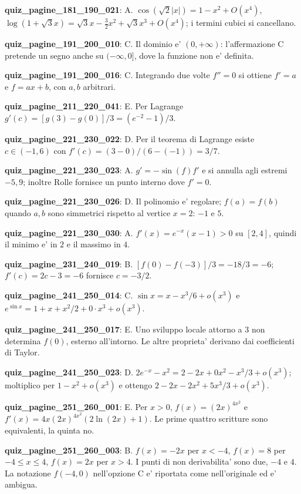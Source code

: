 \documentclass[11pt,a4paper]{article}
\newcounter{quiz}
\begin{document}
\noindent\textbf{quiz\_pagine\_181\_190\_021}: A. $\cos(\sqrt2|x|)=1-x^2+O(x^4)$, $\log(1+\sqrt3x)=\sqrt3x-\frac32x^2+\sqrt3x^3+O(x^4)$; i termini cubici si cancellano.\par\medskip
\noindent\textbf{quiz\_pagine\_191\_200\_010}: C. Il dominio e' $(0,+\infty)$: l'affermazione C pretende un segno anche su $(-\infty,0]$, dove la funzione non e' definita.\par\medskip
\noindent\textbf{quiz\_pagine\_191\_200\_016}: C. Integrando due volte $f''=0$ si ottiene $f'=a$ e $f=ax+b$, con $a,b$ arbitrari.\par\medskip
\noindent\textbf{quiz\_pagine\_211\_220\_041}: E. Per Lagrange $g'(c)=[g(3)-g(0)]/3=(e^{-2}-1)/3$.\par\medskip
\noindent\textbf{quiz\_pagine\_221\_230\_022}: D. Per il teorema di Lagrange esiste $c\in(-1,6)$ con $f'(c)=(3-0)/(6-(-1))=3/7$.\par\medskip
\noindent\textbf{quiz\_pagine\_221\_230\_023}: A. $g'=-\sin(f)f'$ e si annulla agli estremi $-5,9$; inoltre Rolle fornisce un punto interno dove $f'=0$.\par\medskip
\noindent\textbf{quiz\_pagine\_221\_230\_026}: D. Il polinomio e' regolare; $f(a)=f(b)$ quando $a,b$ sono simmetrici rispetto al vertice $x=2$: $-1$ e $5$.\par\medskip
\noindent\textbf{quiz\_pagine\_221\_230\_030}: A. $f'(x)=e^{-x}(x-1)>0$ su $[2,4]$, quindi il minimo e' in $2$ e il massimo in $4$.\par\medskip
\noindent\textbf{quiz\_pagine\_231\_240\_019}: B. $[f(0)-f(-3)]/3=-18/3=-6$; $f\prime(c)=2c-3=-6$ fornisce $c=-3/2$.\par\medskip
\noindent\textbf{quiz\_pagine\_241\_250\_014}: C. $\sin x=x-x^3/6+o(x^3)$ e $e^{\sin x}=1+x+x^2/2+0\cdot x^3+o(x^3)$.\par\medskip
\noindent\textbf{quiz\_pagine\_241\_250\_017}: E. Uno sviluppo locale attorno a 3 non determina $f(0)$, esterno all'intorno. Le altre proprieta' derivano dai coefficienti di Taylor.\par\medskip
\noindent\textbf{quiz\_pagine\_241\_250\_023}: D. $2e^{-x}-x^2=2-2x+0x^2-x^3/3+o(x^3)$; moltiplico per $1-x^2+o(x^3)$ e ottengo $2-2x-2x^2+5x^3/3+o(x^3)$.\par\medskip
\noindent\textbf{quiz\_pagine\_251\_260\_001}: E. Per $x>0$, $f(x)=(2x)^{4x^2}$ e $f'(x)=4x(2x)^{4x^2}(2\ln(2x)+1)$. Le prime quattro scritture sono equivalenti, la quinta no.\par\medskip
\noindent\textbf{quiz\_pagine\_251\_260\_003}: B. $f(x)=-2x$ per $x<-4$, $f(x)=8$ per $-4\leq x\leq4$, $f(x)=2x$ per $x>4$. I punti di non derivabilita' sono due, $-4$ e $4$. La notazione $f(-4,0)$ nell'opzione C e' riportata come nell'originale ed e' ambigua.\par\medskip
\end{document}
